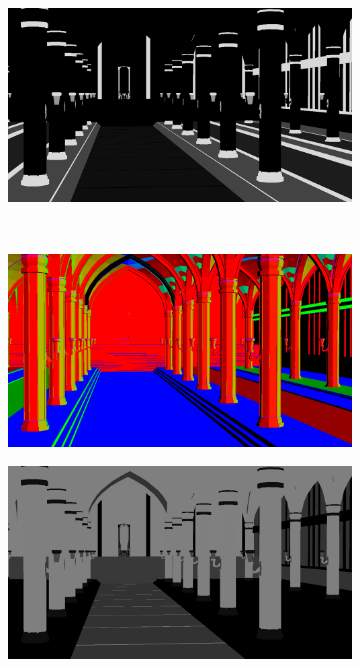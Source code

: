\begin{figure}
\begin{subfigure}{0.24\linewidth}
         \caption{}
         \label{fig:rendering_dataset_emissive}
    \end{subfigure}
    \hfill
    \begin{subfigure}{0.24\linewidth}
        \centering
         \includegraphics[width=\textwidth]{figures/methods/dataset_example/metallic.png}
         \caption{}
         \label{fig:rendering_dataset_metallic}
    \end{subfigure}
    \\
    \hfill
    \begin{subfigure}{0.24\linewidth}
        \centering
         \includegraphics[width=\textwidth]{figures/methods/dataset_example/normal.png}
         \caption{}
         \label{fig:rendering_dataset_normal}
    \end{subfigure}
    \hfill
    \begin{subfigure}{0.24\linewidth}
        \centering
         \includegraphics[width=\textwidth]{figures/methods/dataset_example/roughness.png}

\end{subfigure}
\end{figure}
